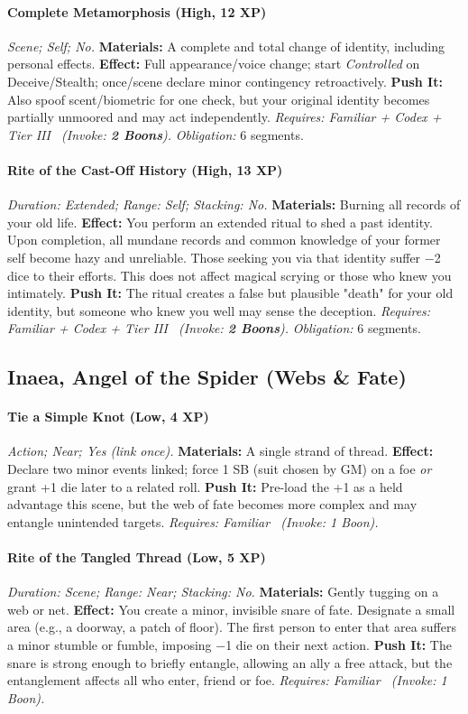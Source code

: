 \paragraph{Complete Metamorphosis (High, 12 XP)} \emph{Scene; Self; No.}
\textbf{Materials:} A complete and total change of identity, including personal effects.
\textbf{Effect:} Full appearance/voice change; start \emph{Controlled} on Deceive/Stealth; once/scene declare minor contingency retroactively.
\textbf{Push It:} Also spoof scent/biometric for one check, but your original identity becomes partially unmoored and may act independently.
\emph{Requires: Familiar + Codex + Tier III \ (\textit{Invoke:} \textbf{2 Boons}).}
\emph{Obligation:} 6 segments.

\paragraph{Rite of the Cast-Off History (High, 13 XP)} \emph{Duration: Extended; Range: Self; Stacking: No.}
\textbf{Materials:} Burning all records of your old life.
\textbf{Effect:} You perform an extended ritual to shed a past identity. Upon completion, all mundane records and common knowledge of your former self become hazy and unreliable. Those seeking you via that identity suffer −2 dice to their efforts. This does not affect magical scrying or those who knew you intimately.
\textbf{Push It:} The ritual creates a false but plausible "death" for your old identity, but someone who knew you well may sense the deception.
\emph{Requires: Familiar + Codex + Tier III \ (\textit{Invoke:} \textbf{2 Boons}).}
\emph{Obligation:} 6 segments.

\subsection{Inaea, Angel of the Spider (Webs \& Fate)}
\paragraph{Tie a Simple Knot (Low, 4 XP)} \emph{Action; Near; Yes (link once).}
\textbf{Materials:} A single strand of thread.
\textbf{Effect:} Declare two minor events linked; force 1 SB (suit chosen by GM) on a foe \emph{or} grant +1 die later to a related roll.
\textbf{Push It:} Pre-load the +1 as a held advantage this scene, but the web of fate becomes more complex and may entangle unintended targets.
\emph{Requires: Familiar \ (\textit{Invoke:} 1 Boon).}
\paragraph{Rite of the Tangled Thread (Low, 5 XP)} \emph{Duration: Scene; Range: Near; Stacking: No.}
\textbf{Materials:} Gently tugging on a web or net.
\textbf{Effect:} You create a minor, invisible snare of fate. Designate a small area (e.g., a doorway, a patch of floor). The first person to enter that area suffers a minor stumble or fumble, imposing −1 die on their next action.
\textbf{Push It:} The snare is strong enough to briefly entangle, allowing an ally a free attack, but the entanglement affects all who enter, friend or foe.
\emph{Requires: Familiar \ (\textit{Invoke:} 1 Boon).}

